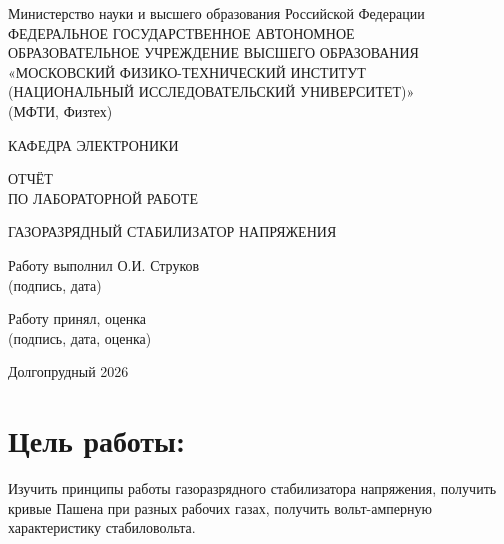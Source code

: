 \documentclass[12pt]{article}
\begin{document}
\thispagestyle{empty}

\begin{center}

\large
Министерство науки и высшего образования Российской Федерации \\
\large
ФЕДЕРАЛЬНОЕ ГОСУДАРСТВЕННОЕ АВТОНОМНОЕ \\
ОБРАЗОВАТЕЛЬНОЕ УЧРЕЖДЕНИЕ ВЫСШЕГО ОБРАЗОВАНИЯ \\
\large
«МОСКОВСКИЙ ФИЗИКО-ТЕХНИЧЕСКИЙ ИНСТИТУТ \\
(НАЦИОНАЛЬНЫЙ ИССЛЕДОВАТЕЛЬСКИЙ УНИВЕРСИТЕТ)» \\
(МФТИ, Физтех)

\vspace{4cm}

\large
КАФЕДРА ЭЛЕКТРОНИКИ

\vspace{0.7cm}

\Large
ОТЧЁТ \\
ПО ЛАБОРАТОРНОЙ РАБОТЕ

\vspace{0.7cm}

\Large
ГАЗОРАЗРЯДНЫЙ СТАБИЛИЗАТОР НАПРЯЖЕНИЯ

\vfill

\noindent
Работу выполнил \hfill \underline{\hspace{6cm}} О.И. Струков \\
\hfill \small{(подпись, дата) \qquad \qquad \qquad \qquad \qquad \qquad \qquad}\par

\vspace{3cm}
\large
\noindent
Работу принял, оценка \hfill \underline{\hspace{6cm}} \\
\hfill \small{(подпись, дата, оценка) \qquad}

\vfill

Долгопрудный 2026

\end{center}
\thispagestyle{empty}

\newpage
{}
\section*{\textbf{Цель работы:}} Изучить принципы работы газоразрядного стабилизатора напряжения, получить кривые Пашена при разных рабочих газах, получить вольт-амперную характеристику стабиловольта.
\end{document}

